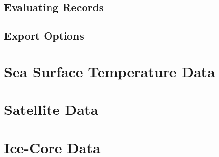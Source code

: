\documentclass{article}\usepackage[]{graphicx}\usepackage[]{color}
\begin{document}
\subsection{Evaluating Records}

\subsection{Export Options}

\section{Sea Surface Temperature Data}

\section{Satellite Data}

\section{Ice-Core Data}
\end{document}
